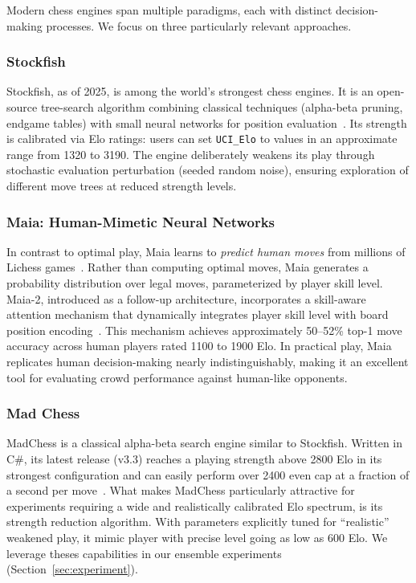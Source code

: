 \documentclass[sigconf]{aamas}
\begin{document}
Modern chess engines span multiple paradigms, each with distinct decision-making processes.
We focus on three particularly relevant approaches.

\subsubsection{Stockfish}

Stockfish, as of 2025, is among the world's strongest chess engines.
It is an open-source tree-search algorithm combining classical techniques (alpha-beta pruning, endgame tables) with small neural networks for position evaluation~\cite{stockfish2024}.
Its strength is calibrated via Elo ratings: users can set \texttt{UCI\_Elo} to values in an approximate range from 1320 to 3190.
The engine deliberately weakens its play through stochastic evaluation perturbation (seeded random noise), ensuring exploration of different move trees at reduced strength levels.

\subsubsection{Maia: Human-Mimetic Neural Networks}

In contrast to optimal play, Maia learns to \emph{predict human moves} from millions of Lichess games~\cite{mcilroy-young2020}.
Rather than computing optimal moves, Maia generates a probability distribution over legal moves, parameterized by player skill level.
Maia-2, introduced as a follow-up architecture, incorporates a skill-aware attention mechanism that dynamically integrates player skill level with board position encoding~\cite{maia2024}.
This mechanism achieves approximately 50--52\% top-1 move accuracy across human players rated 1100 to 1900 Elo.
In practical play, Maia replicates human decision-making nearly indistinguishably, making it an excellent tool for evaluating crowd performance against human-like opponents.

\subsubsection{Mad Chess}

MadChess is a classical alpha-beta search engine similar to Stockfish.
Written in C\#, its latest release (v3.3) reaches a playing strength above 2800 Elo in its strongest configuration and can easily perform over 2400 even cap at a fraction of a second per move~\cite{madchess2025}.
What makes MadChess particularly attractive for experiments requiring a wide and realistically calibrated Elo spectrum, is its strength reduction algorithm.
With parameters explicitly tuned for “realistic” weakened play, it mimic player with precise level going as low as 600 Elo.
We leverage theses capabilities in our ensemble experiments (Section~\ref{sec:experiment}).
\end{document}
